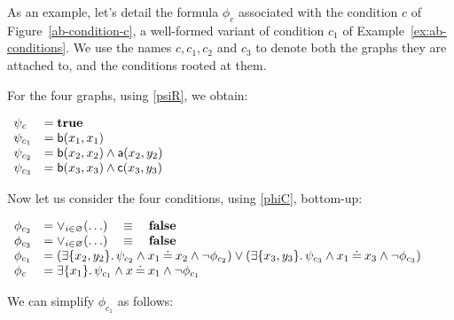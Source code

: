 \begin{example}
As an example, let's detail the formula $\phi_{c}$ associated with the condition $c$ of Figure~\ref{ab-condition-c}, a well-formed variant of condition $c_1$ of Example~\ref{ex:ab-conditions}.  We use the names $c,c_1,c_2$ and $c_3$ to denote both the graphs they are attached to, and the conditions rooted at them.

For the four graphs, using \eqref{psiR}, we obtain:

$
\begin{array}{ll}
\psi_{c} &= \textbf{true}\\
\psi_{c_{1}} &= \mathsf{b}(x_{1},x_{1})\\
\psi_{c_{2}} &= \mathsf{b}(x_{2},x_{2})\land \mathsf{a}(x_{2},y_{2})\\ 
\psi_{c_{3}} &= \mathsf{b}(x_{3},x_{3})\land \mathsf{c}(x_{3},y_{3})\\
\end{array}
$

\medskip
Now let us consider the four conditions, using \eqref{phiC}, bottom-up: 

$
\begin{array}{ll}
\phi_{c_{2}} & = \vee_{i \in \varnothing} (\ldots) \quad \equiv \quad  \textbf{false}\\
\phi_{c_{3}} & =  \vee_{i \in \varnothing} (\ldots) \quad \equiv \quad  \textbf{false}\\
 \phi_{c_{1}} & = (\exists \{x_{2},y_{2}\} .\, \psi_{c_{2}} \land x_{1} \mathbin{\doteq} x_{2} \land \neg \phi_{c_{2}}) \vee (\exists \{x_{3},y_{3}\} .\,  \psi_{c_{3}} \land x_{1} \mathbin{\doteq} x_{3} \land \neg \phi_{c_{3}})\\
 \phi_{c} & = \exists \{x_{1}\}.\, \psi_{c_{1}} \land x \mathbin{\doteq} x_{1} \land  \neg \phi_{c_{1}}
\end{array}
$

\medskip
We can simplify $\phi_{c_1}$ as follows: 


\end{example}
